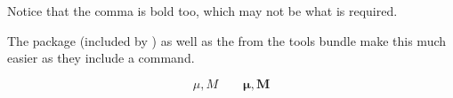 \noindent
Notice that the comma is bold too, which may not be what is required.

The package  (included by ) as well as the
 from the tools bundle make this much easier as they include
a  command.
\ifx\boldsymbol\undefined\else
\begin{example}
\begin{displaymath}
\mu, M \qquad
\boldsymbol{\mu}, \boldsymbol{M}
\end{displaymath}
\end{example}
\fi


%

